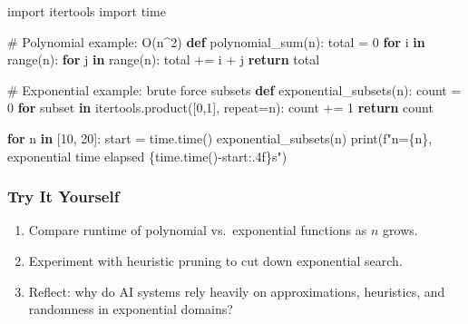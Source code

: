 \documentclass[
  letterpaper,
  DIV=11,
  numbers=noendperiod]{scrreprt}
\newenvironment{Shaded}{\begin{snugshade}}{\end{snugshade}}
\newcommand{\BuiltInTok}[1]{\textcolor[rgb]{0.00,0.23,0.31}{#1}}
\newcommand{\CommentTok}[1]{\textcolor[rgb]{0.37,0.37,0.37}{#1}}
\newcommand{\ControlFlowTok}[1]{\textcolor[rgb]{0.00,0.23,0.31}{\textbf{#1}}}
\newcommand{\DecValTok}[1]{\textcolor[rgb]{0.68,0.00,0.00}{#1}}
\newcommand{\ImportTok}[1]{\textcolor[rgb]{0.00,0.46,0.62}{#1}}
\newcommand{\KeywordTok}[1]{\textcolor[rgb]{0.00,0.23,0.31}{\textbf{#1}}}
\newcommand{\NormalTok}[1]{\textcolor[rgb]{0.00,0.23,0.31}{#1}}
\newcommand{\OperatorTok}[1]{\textcolor[rgb]{0.37,0.37,0.37}{#1}}
\newcommand{\SpecialCharTok}[1]{\textcolor[rgb]{0.37,0.37,0.37}{#1}}
\newcommand{\SpecialStringTok}[1]{\textcolor[rgb]{0.13,0.47,0.30}{#1}}
\providecommand{\tightlist}{%
  \setlength{\itemsep}{0pt}\setlength{\parskip}{0pt}}
\begin{document}
\begin{Shaded}
\begin{Highlighting}[]
\ImportTok{import}\NormalTok{ itertools}
\ImportTok{import}\NormalTok{ time}

\CommentTok{\# Polynomial example: O(n\^{}2)}
\KeywordTok{def}\NormalTok{ polynomial\_sum(n):}
\NormalTok{    total }\OperatorTok{=} \DecValTok{0}
    \ControlFlowTok{for}\NormalTok{ i }\KeywordTok{in} \BuiltInTok{range}\NormalTok{(n):}
        \ControlFlowTok{for}\NormalTok{ j }\KeywordTok{in} \BuiltInTok{range}\NormalTok{(n):}
\NormalTok{            total }\OperatorTok{+=}\NormalTok{ i }\OperatorTok{+}\NormalTok{ j}
    \ControlFlowTok{return}\NormalTok{ total}

\CommentTok{\# Exponential example: brute force subsets}
\KeywordTok{def}\NormalTok{ exponential\_subsets(n):}
\NormalTok{    count }\OperatorTok{=} \DecValTok{0}
    \ControlFlowTok{for}\NormalTok{ subset }\KeywordTok{in}\NormalTok{ itertools.product([}\DecValTok{0}\NormalTok{,}\DecValTok{1}\NormalTok{], repeat}\OperatorTok{=}\NormalTok{n):}
\NormalTok{        count }\OperatorTok{+=} \DecValTok{1}
    \ControlFlowTok{return}\NormalTok{ count}

\ControlFlowTok{for}\NormalTok{ n }\KeywordTok{in}\NormalTok{ [}\DecValTok{10}\NormalTok{, }\DecValTok{20}\NormalTok{]:}
\NormalTok{    start }\OperatorTok{=}\NormalTok{ time.time()}
\NormalTok{    exponential\_subsets(n)}
    \BuiltInTok{print}\NormalTok{(}\SpecialStringTok{f"n=}\SpecialCharTok{\{}\NormalTok{n}\SpecialCharTok{\}}\SpecialStringTok{, exponential time elapsed }\SpecialCharTok{\{}\NormalTok{time}\SpecialCharTok{.}\NormalTok{time()}\OperatorTok{{-}}\NormalTok{start}\SpecialCharTok{:.4f\}}\SpecialStringTok{s"}\NormalTok{)}
\end{Highlighting}
\end{Shaded}

\subsubsection{Try It Yourself}\label{try-it-yourself-33}

\begin{enumerate}
\def\labelenumi{\arabic{enumi}.}
\tightlist
\item
  Compare runtime of polynomial vs.~exponential functions as \(n\)
  grows.
\item
  Experiment with heuristic pruning to cut down exponential search.
\item
  Reflect: why do AI systems rely heavily on approximations, heuristics,
  and randomness in exponential domains?
\end{enumerate}
\end{document}
